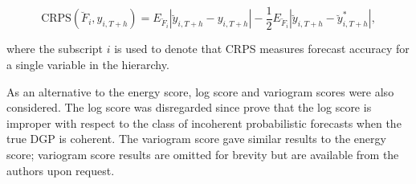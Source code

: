 \documentclass[graybox]{svmult}
\begin{document}
\begin{equation*} 
\text{CRPS}(\breve{F}_i,y_{i,T+h}) = E_{\breve{F}_i}|\breve{y}_{i,T+h}-y_{i,T+h}| - \frac{1}{2}E_{\breve{F}_i}|\breve{y}_{i,T+h}-\breve{y}^*_{i,T+h}|,
\end{equation*}

where the subscript $i$ is used to denote that CRPS measures forecast accuracy for a single variable in the hierarchy.

As an alternative to the energy score, log score and variogram scores were also considered.  The log score was disregarded since \cite{Gamakumara2018} prove that the log score is improper with respect to the class of incoherent probabilistic forecasts when the true DGP is coherent.  {\color{orange}The variogram score gave similar results to the energy score; variogram score results are omitted for brevity but are available from the authors upon request.}


%
%
%
%
%
%
%
\end{document}
